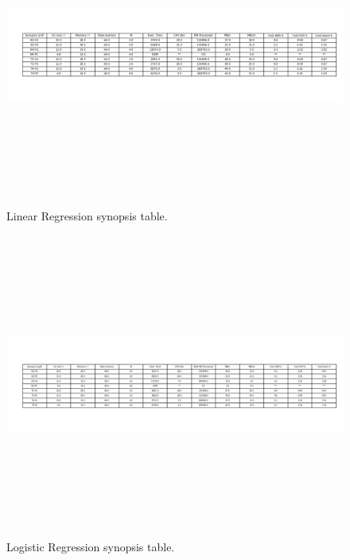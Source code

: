 \documentclass[twocolumn,10pt]{asme2e}
\begin{document}
\begin{figure}[h!]
        \includegraphics[width=20cm,height=10cm]{linr_table.png}
	\caption{Linear Regression synopsis table.}
	\label{fig:linr_table}
\end{figure}

\begin{figure}[h!]
        \includegraphics[width=20cm,height=10cm]{logr_table.png}
	\caption{Logistic Regression synopsis table.}
	\label{fig:logr_table}
\end{figure}
\end{document}

